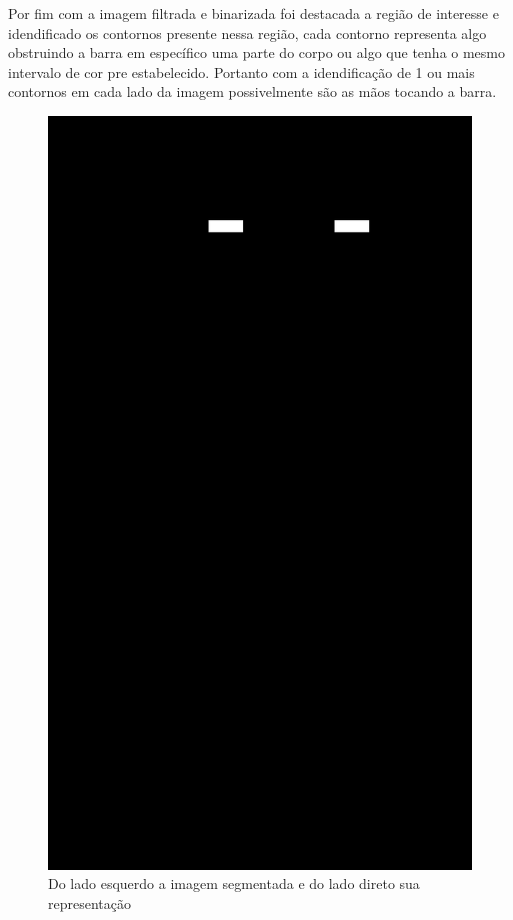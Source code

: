 Por fim com a imagem filtrada e binarizada foi destacada a região de interesse e idendificado os contornos presente nessa região, cada contorno representa algo obstruindo a barra em específico uma parte do corpo ou algo que tenha o mesmo intervalo de cor pre estabelecido. Portanto com a idendificação de 1 ou mais contornos em cada lado da imagem possivelmente são as mãos tocando a barra.

\begin{figure}[H]
    \centering
    \caption{Do lado esquerdo a imagem segmentada e do lado direto sua representação}
        \begin{minipage}{\sizeImg\textwidth}
            \includegraphics[width=\textwidth]{figuras/mao_barra/only_hands.png}

\end{minipage}
\end{figure}
